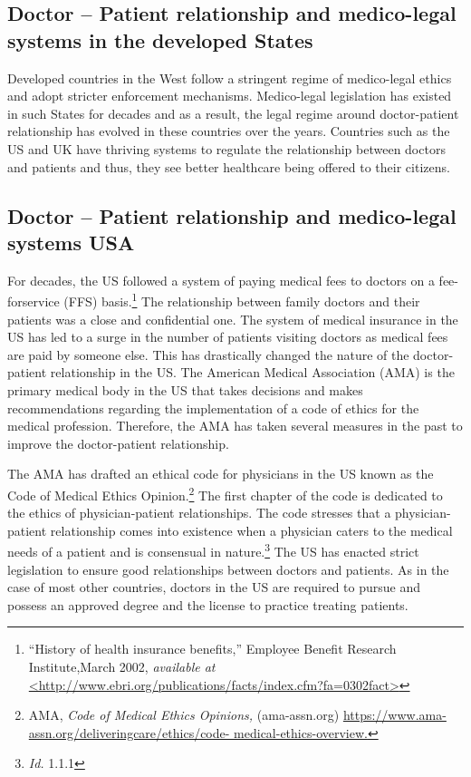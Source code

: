 \begin{multicols}{2}
\subsection*{Doctor – Patient relationship and medico-legal systems in the developed States}

\noi
Developed countries in the West follow a stringent regime of medico-legal ethics and adopt stricter enforcement mechanisms. Medico-legal legislation has existed in such States for decades and as a result, the legal regime around doctor-patient relationship has evolved in these countries over the years. Countries such as the US and UK have thriving systems to regulate the relationship between doctors and patients and thus, they see better healthcare being offered to their citizens.

\subsection*{Doctor – Patient relationship and medico-legal systems USA}

\noi
For decades, the US followed a system of paying medical fees to doctors on a fee-forservice (FFS) basis.\footnote{“History of health insurance benefits,” Employee Benefit Research Institute,March 2002, \textit{available at}  \url{<http://www.ebri.org/publications/facts/index.cfm?fa=0302fact>}} The relationship between family doctors and their patients was a close and confidential one. The system of medical insurance in the US has led to a surge in the number of patients visiting doctors as medical fees are paid by someone else. This has drastically changed the nature of the doctor-patient relationship in the US. The American Medical Association (AMA) is the primary medical body in the US that takes decisions and makes recommendations regarding the implementation of a code of ethics for the medical profession. Therefore, the AMA has taken several measures in the past to improve the doctor-patient relationship.

\noi
The AMA has drafted an ethical code for physicians in the US known as the Code of Medical Ethics Opinion.\footnote{AMA, \textit{Code of Medical Ethics Opinions,} (ama-assn.org)  \url{https://www.ama-assn.org/deliveringcare/ethics/code- medical-ethics-overview.}} The first chapter of the code is dedicated to the ethics of physician-patient relationships. The code stresses that a physician-patient relationship comes into existence when a physician caters to the medical needs of a patient and is consensual in nature.\footnote{\textit{Id.} 1.1.1} The US has enacted strict legislation to ensure good relationships between doctors and patients. As in the case of most other countries, doctors in the US are required to pursue and possess an approved degree and the license to practice treating patients.


\end{multicols}
